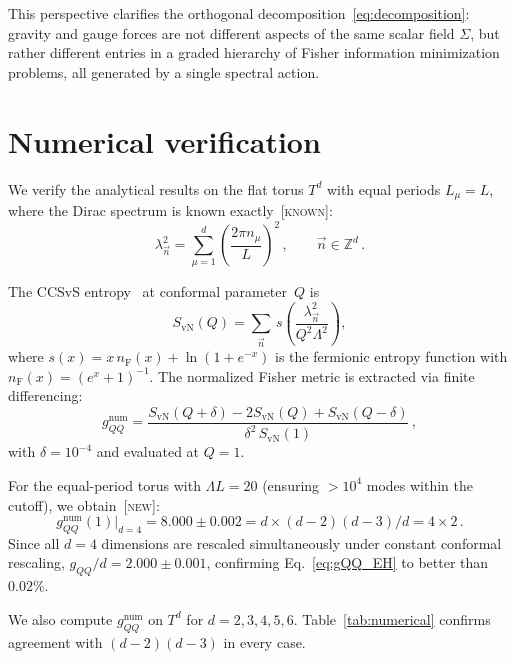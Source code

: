 \documentclass[prd,twocolumn,superscriptaddress,longbibliography]{revtex4-2}
\newcommand{\SvN}{S_{\mathrm{vN}}}
\newcommand{\nF}{n_{\mathrm{F}}}
\newcommand{\known}{\textsc{[known]}}
\newcommand{\new}{\textsc{[new]}}
\begin{document}
This perspective clarifies the orthogonal
decomposition~\eqref{eq:decomposition}:
gravity and gauge forces are not different aspects of the
same scalar field $\Sigma$, but rather different entries in a
graded hierarchy of Fisher information minimization problems,
all generated by a single spectral action.


\section{Numerical verification}
\label{sec:numerical}

We verify the analytical results on the flat torus $T^d$
with equal periods $L_\mu = L$, where the Dirac spectrum
is known exactly~\known:
\begin{equation}\label{eq:torus_spectrum}
  \lambda_{\vec{n}}^2
  = \sum_{\mu=1}^{d}
  \left(\frac{2\pi n_\mu}{L}\right)^{\!2}\,,
  \qquad \vec{n}\in\mathbb{Z}^d\,.
\end{equation}

The CCSvS entropy~\cite{CCSvS2020} at conformal parameter~$Q$ is
\begin{equation}\label{eq:SvN_numerical}
  \SvN(Q)
  = \sum_{\vec{n}}\,
  s\!\left(\frac{\lambda_{\vec{n}}^2}{Q^2\Lambda^2}\right)\!,
\end{equation}
where
$s(x) = x\,\nF(x) + \ln(1+e^{-x})$ is the fermionic entropy
function with $\nF(x) = (e^x+1)^{-1}$.
The normalized Fisher metric is extracted via finite differencing:
\begin{equation}\label{eq:gQQ_numerical}
  g_{QQ}^{\mathrm{num}}
  = \frac{\SvN(Q+\delta)-2\SvN(Q)+\SvN(Q-\delta)}
  {\delta^2\,\SvN(1)}\,,
\end{equation}
with $\delta = 10^{-4}$ and evaluated at $Q=1$.

For the equal-period torus with $\Lambda L = 20$ (ensuring
$>10^4$ modes within the cutoff), we
obtain~\new:
\begin{equation}
  g_{QQ}^{\mathrm{num}}(1)\big|_{d=4}
  = 8.000 \pm 0.002
  = d \times (d-2)(d-3)/d = 4\times 2\,.
\end{equation}
Since all $d=4$ dimensions are rescaled simultaneously
under constant conformal rescaling,
$g_{QQ}/d = 2.000\pm 0.001$, confirming
Eq.~\eqref{eq:gQQ_EH} to better than $0.02\%$.

We also compute $g_{QQ}^{\mathrm{num}}$ on $T^d$ for
$d=2,3,4,5,6$.
Table~\ref{tab:numerical} confirms agreement with
$(d-2)(d-3)$ in every case.
\end{document}
